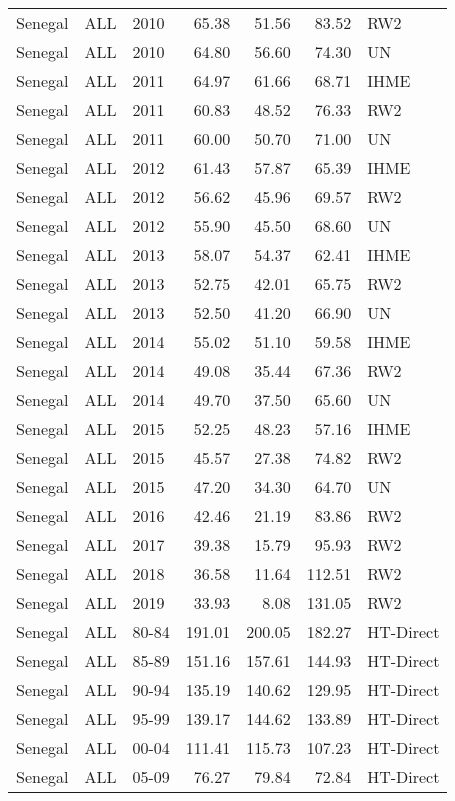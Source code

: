 \begin{longtable}{lllrrrl}
  Senegal & ALL & 2010 & 65.38 & 51.56 & 83.52 & RW2 \\ 
  Senegal & ALL & 2010 & 64.80 & 56.60 & 74.30 & UN \\ 
  Senegal & ALL & 2011 & 64.97 & 61.66 & 68.71 & IHME \\ 
  Senegal & ALL & 2011 & 60.83 & 48.52 & 76.33 & RW2 \\ 
  Senegal & ALL & 2011 & 60.00 & 50.70 & 71.00 & UN \\ 
  Senegal & ALL & 2012 & 61.43 & 57.87 & 65.39 & IHME \\ 
  Senegal & ALL & 2012 & 56.62 & 45.96 & 69.57 & RW2 \\ 
  Senegal & ALL & 2012 & 55.90 & 45.50 & 68.60 & UN \\ 
  Senegal & ALL & 2013 & 58.07 & 54.37 & 62.41 & IHME \\ 
  Senegal & ALL & 2013 & 52.75 & 42.01 & 65.75 & RW2 \\ 
  Senegal & ALL & 2013 & 52.50 & 41.20 & 66.90 & UN \\ 
  Senegal & ALL & 2014 & 55.02 & 51.10 & 59.58 & IHME \\ 
  Senegal & ALL & 2014 & 49.08 & 35.44 & 67.36 & RW2 \\ 
  Senegal & ALL & 2014 & 49.70 & 37.50 & 65.60 & UN \\ 
  Senegal & ALL & 2015 & 52.25 & 48.23 & 57.16 & IHME \\ 
  Senegal & ALL & 2015 & 45.57 & 27.38 & 74.82 & RW2 \\ 
  Senegal & ALL & 2015 & 47.20 & 34.30 & 64.70 & UN \\ 
  Senegal & ALL & 2016 & 42.46 & 21.19 & 83.86 & RW2 \\ 
  Senegal & ALL & 2017 & 39.38 & 15.79 & 95.93 & RW2 \\ 
  Senegal & ALL & 2018 & 36.58 & 11.64 & 112.51 & RW2 \\ 
  Senegal & ALL & 2019 & 33.93 & 8.08 & 131.05 & RW2 \\ 
  Senegal & ALL & 80-84 & 191.01 & 200.05 & 182.27 & HT-Direct \\ 
  Senegal & ALL & 85-89 & 151.16 & 157.61 & 144.93 & HT-Direct \\ 
  Senegal & ALL & 90-94 & 135.19 & 140.62 & 129.95 & HT-Direct \\ 
  Senegal & ALL & 95-99 & 139.17 & 144.62 & 133.89 & HT-Direct \\ 
  Senegal & ALL & 00-04 & 111.41 & 115.73 & 107.23 & HT-Direct \\ 
  Senegal & ALL & 05-09 & 76.27 & 79.84 & 72.84 & HT-Direct \\ 

\end{longtable}
